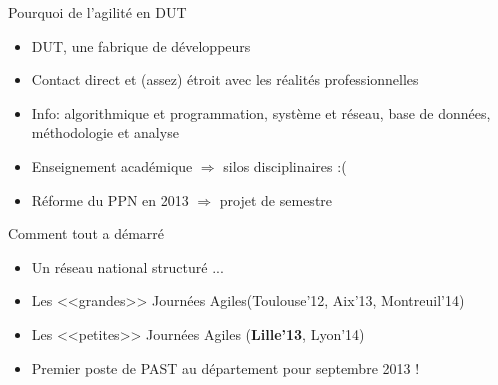 \documentclass{beamer}
\begin{document}
\begin{frame}{Pourquoi de l'agilité en DUT}
   \begin{itemize}
    \item DUT, une fabrique de développeurs
    \item Contact direct et (assez) étroit avec les réalités professionnelles
    \item Info: algorithmique et programmation, système et réseau, base de données, méthodologie et analyse
    \item Enseignement académique $\Rightarrow$ silos disciplinaires :(
    \item Réforme du PPN en 2013 $\Rightarrow$ projet de semestre
   \end{itemize}
\end{frame}

\begin{frame}{Comment tout a démarré}
   \begin{itemize}
     \item Un réseau national structuré ...
     \item Les <<grandes>> Journées Agiles(Toulouse'12, Aix'13, Montreuil'14)
     \item Les <<petites>> Journées Agiles (\textbf{Lille'13}, Lyon'14)
     \item Premier poste de PAST au département pour septembre 2013 !
   \end{itemize}
\end{frame}

{
\begin{frame}[plain]
\end{frame}
}
\end{document}
